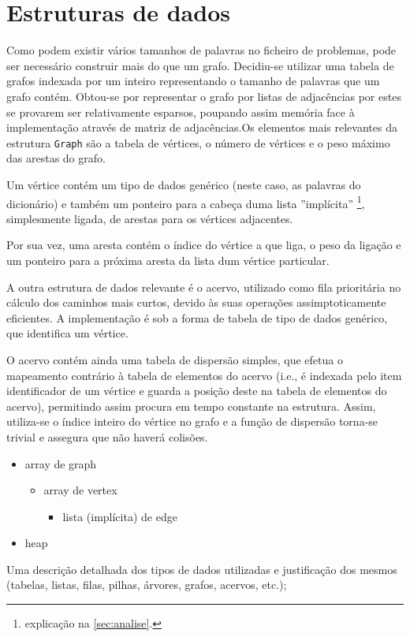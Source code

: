 \documentclass[a4paper, 18pt]{article}
\begin{document}
\section{Estruturas de dados}
	\par
	Como podem existir vários tamanhos de palavras no ficheiro de problemas, pode ser necessário construir mais do que um grafo. Decidiu-se utilizar uma tabela de grafos indexada por um inteiro representando o tamanho de palavras que um grafo contém. Obtou-se por representar o grafo por listas de adjacências por estes se provarem ser relativamente esparsos, poupando assim memória face à implementação através de matriz de adjacências.Os elementos mais relevantes da estrutura \texttt{Graph} são a tabela de vértices, o número de vértices e o peso máximo das arestas do grafo.
	\par
	Um vértice contém um tipo de dados genérico (neste caso, as palavras do dicionário) e também um ponteiro para a cabeça duma lista ''implícita'' \footnote{explicação na \autoref{sec:analise}.}, simplesmente ligada, de arestas para os vértices adjacentes.
	\par
	Por sua vez, uma aresta contém o índice do vértice a que liga, o peso da ligação e um ponteiro para a próxima aresta da lista dum vértice particular.
	\par\null\par
	A outra estrutura de dados relevante é o acervo, utilizado como fila prioritária no cálculo dos caminhos mais curtos, devido às suas operações assimptoticamente eficientes. A implementação é sob a forma de tabela de tipo de dados genérico, que identifica um vértice.
	\par
	O acervo contém ainda uma tabela de dispersão simples, que efetua o mapeamento contrário à tabela de elementos do acervo (i.e., é indexada pelo item identificador de um vértice e guarda a posição deste na tabela de elementos do acervo), permitindo assim procura em tempo constante na estrutura. Assim, utiliza-se o índice inteiro do vértice no grafo e a função de dispersão torna-se trivial e assegura que não haverá colisões.

	\begin{itemize}
		\item array de graph
		\begin{itemize}
			\item array de vertex
			\begin{itemize}
				\item lista (implícita) de edge
			\end{itemize}
		\end{itemize}

		\item heap
	\end{itemize}
	\par
	Uma descrição detalhada dos tipos de dados utilizadas e justificação dos mesmos
(tabelas, listas, filas, pilhas, árvores, grafos, acervos, etc.);
\end{document}
